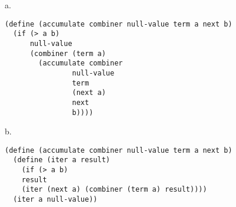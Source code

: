 \documentclass[a4paper,12pt]{article}
\begin{document}
\noindent
a.
\begin{lstlisting}
(define (accumulate combiner null-value term a next b)
  (if (> a b)
      null-value
      (combiner (term a)
		(accumulate combiner
			    null-value
			    term
			    (next a)
			    next
			    b))))
\end{lstlisting}

\medskip \noindent
b.
\begin{lstlisting}
(define (accumulate combiner null-value term a next b)
  (define (iter a result)
    (if (> a b)
	result
	(iter (next a) (combiner (term a) result))))
  (iter a null-value))
\end{lstlisting}
\end{document}
